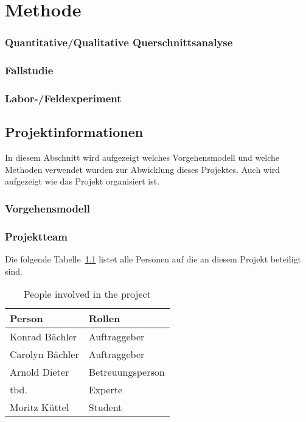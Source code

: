 \chapter{Methode}
\subsection{Quantitative/Qualitative Querschnittsanalyse}

\subsection{Fallstudie}

\subsection{Labor-/Feldexperiment}

\section{Projektinformationen}

In diesem Abschnitt wird aufgezeigt welches Vorgehensmodell und welche Methoden verwendet wurden zur Abwicklung dieses Projektes.
Auch wird aufgezeigt wie das Projekt organisiert ist.

\subsection{Vorgehensmodell}



\subsection{Projektteam}

Die folgende Tabelle~\ref{tab:projectmembers} listet alle Personen auf die an diesem Projekt beteiligt sind.

\begin{table}[H]
    \begin{tabular}{l p{3.2cm}}
        \toprule
        \bfseries Person   & \bfseries Rollen \\
        \midrule
        Konrad Bächler     & Auftraggeber \\
        \midrule
        Carolyn Bächler    & Auftraggeber \\
        \midrule
        Arnold Dieter      & Betreuungsperson \\
        \midrule
        tbd.               & Experte \\
        \midrule
        Moritz Küttel      & Student \\
        \bottomrule
    \end{tabular}
    \caption{People involved in the project}\label{tab:projectmembers}
\end{table}

